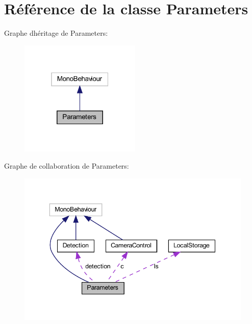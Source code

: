 \hypertarget{class_parameters}{}\section{Référence de la classe Parameters}
\label{class_parameters}


Graphe d\textquotesingle{}héritage de Parameters\+:\nopagebreak
\begin{figure}[H]
\begin{center}
\leavevmode
\includegraphics[width=163pt]{class_parameters__inherit__graph}
\end{center}
\end{figure}


Graphe de collaboration de Parameters\+:\nopagebreak
\begin{figure}[H]
\begin{center}
\leavevmode
\includegraphics[width=343pt]{class_parameters__coll__graph}
\end{center}
\end{figure}
